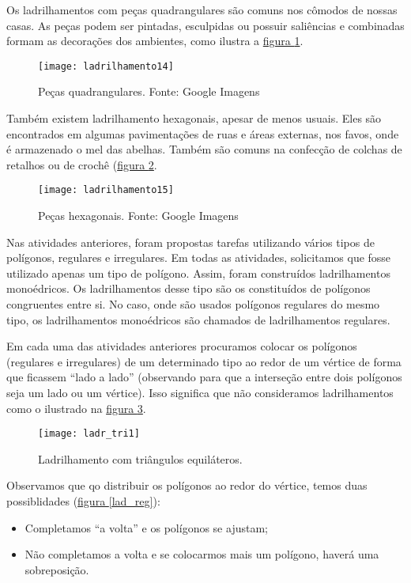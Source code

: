 

Os ladrilhamentos com peças quadrangulares são comuns nos cômodos de nossas casas. As peças podem ser pintadas, esculpidas ou possuir saliências e combinadas formam as decorações dos ambientes, como ilustra a \hyperref[lad_qd]{figura \ref{lad_qd}}.
 


\begin{figure}[H]
\centering
\texttt{[image: ladrilhamento14]}
\caption{Peças quadrangulares. Fonte: Google Imagens }
\label{lad_qd}
\end{figure}

Também existem ladrilhamento hexagonais, apesar de menos usuais. Eles são encontrados em algumas pavimentações de ruas e áreas externas, nos favos, onde é armazenado o mel das abelhas. Também são comuns na confecção de colchas de retalhos  ou  de crochê (\hyperref[lad_hex]{figura \ref{lad_hex}}.

\begin{figure}[H]
\centering
\texttt{[image: ladrilhamento15]}
\caption{Peças hexagonais. Fonte: Google Imagens }
\label{lad_hex}
\end{figure}

Nas atividades anteriores, foram propostas tarefas utilizando vários tipos de polígonos, regulares e irregulares. Em todas as atividades, solicitamos que fosse utilizado apenas um tipo de polígono. Assim, foram construídos ladrilhamentos monoédricos. Os ladrilhamentos desse tipo são os constituídos de polígonos congruentes entre si. No caso, onde são usados polígonos regulares do mesmo tipo, os ladrilhamentos monoédricos são chamados de ladrilhamentos regulares.

Em cada uma das atividades anteriores procuramos colocar os polígonos (regulares e irregulares) de um determinado tipo ao redor de um vértice de forma que ficassem “lado a lado” (observando para que a interseção entre dois polígonos seja um lado ou um vértice). Isso significa que não consideramos ladrilhamentos como o ilustrado na \hyperref[ladr_tri1]{figura \ref{ladr_tri1}}. 

\begin{figure}[H]
\centering
\texttt{[image: ladr\_tri1]}
\caption{Ladrilhamento com triângulos equiláteros.}
\label{ladr_tri1}
\end{figure}


Observamos que qo distribuir os polígonos ao redor do vértice,  temos duas possiblidades (\hyperref[lad_reg]{figura \ref{lad_reg}}): 
\begin{itemize}
\item	Completamos “a volta” e os polígonos se ajustam;
\item 	Não completamos a volta e se colocarmos mais um polígono, haverá uma sobreposição.
\end{itemize}


